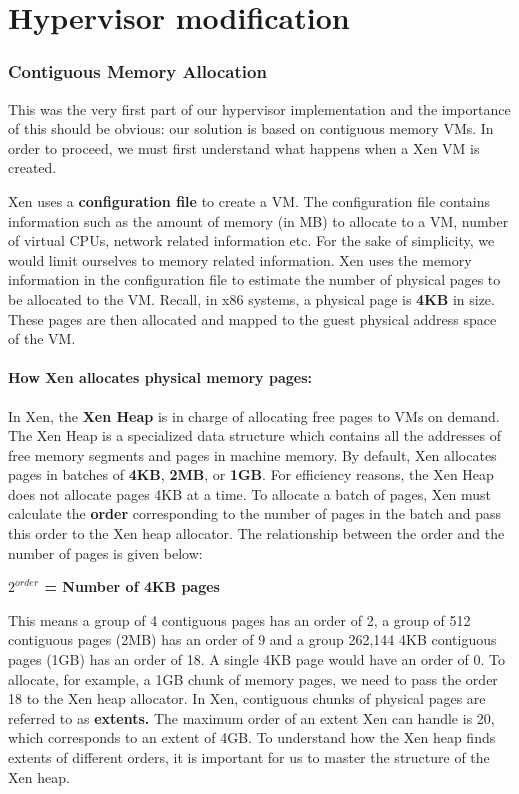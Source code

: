 \documentclass[sigconf]{sigplanconf}
\begin{document}
  \section{Hypervisor modification}
  
  \subsubsection{Contiguous Memory Allocation }
  This was the very first part of our hypervisor implementation and the importance of this should be obvious: our solution is based on contiguous memory VMs. In order to proceed, we must first understand what happens when a Xen VM is created.
  
  Xen uses a \textbf{configuration file} to create a VM. The configuration file contains information such as the amount of memory (in MB) to allocate to a VM, number of virtual CPUs, network related information etc. For the sake of simplicity, we would limit ourselves to memory related information. Xen uses the memory information in the configuration file to estimate the number of physical pages to be allocated to the VM. Recall, in x86 systems, a physical page is \textbf{4KB} in size. These pages are then allocated and mapped to the guest physical address space of the VM.
  
  \paragraph{How Xen allocates physical memory pages:}
  In Xen, the \textbf{Xen Heap} is in charge of allocating free pages to VMs on demand. The Xen Heap is a specialized data structure which contains all the addresses of free memory segments and pages in machine memory. By default, Xen allocates pages in batches of \textbf{4KB}, \textbf{2MB}, or \textbf{1GB}. For efficiency reasons, the Xen Heap does not allocate pages 4KB at a time. To allocate a batch of pages, Xen must calculate the \textbf{order} corresponding to the number of pages in the batch and pass this order to the Xen heap allocator. The relationship between the order and the number of pages is given below:
  \begin{center}
  	\textbf{ $2^{ order}$ = Number of 4KB pages}
  \end{center}
  This means a group of 4 contiguous pages has an order of 2, a group of 512 contiguous pages (2MB) has an order of 9 and a group 262,144 4KB contiguous pages (1GB) has an order of 18. A single 4KB page would have an order of 0. To allocate, for example, a 1GB chunk of memory pages, we need to pass the order 18 to the Xen heap allocator. In Xen, contiguous chunks of physical pages are referred to as \textbf{extents.} The maximum order of an extent Xen can handle is 20, which corresponds to an extent of 4GB. To understand how the Xen heap finds extents of different orders, it is important for us to master the structure of the Xen heap. 
  
\end{document}
